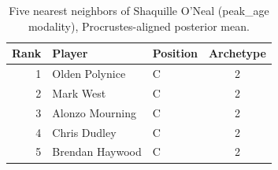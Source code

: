 \begin{table}[htbp]
  \centering\small
  \begin{tabular}{rllc}
    \toprule
    Rank & Player & Position & Archetype \\
    \midrule
    1 & Olden Polynice & C & 2 \\
    2 & Mark West & C & 2 \\
    3 & Alonzo Mourning & C & 2 \\
    4 & Chris Dudley & C & 2 \\
    5 & Brendan Haywood & C & 2 \\
    \bottomrule
  \end{tabular}
  \caption{Five nearest neighbors of Shaquille O'Neal (peak_age modality), Procrustes-aligned posterior mean.}
  \label{tab:Shaquille_O_Neal_neighbors_peak_age}
\end{table}

